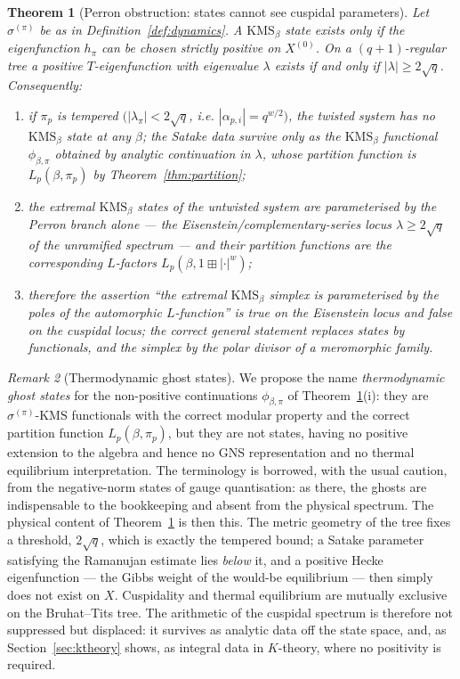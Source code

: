 \documentclass[11pt]{amsart}
\numberwithin{equation}{section}
\newtheorem{theorem}{Theorem}[section]
\theoremstyle{definition}
\theoremstyle{remark}
\newtheorem{remark}[theorem]{Remark}
\newcommand{\KMS}{\mathrm{KMS}}
\begin{document}
\begin{theorem}[Perron obstruction: states cannot see cuspidal parameters]\label{thm:perron}
Let $\sigma^{(\pi)}$ be as in Definition~\ref{def:dynamics}. A $\KMS_\beta$ state exists
only if the eigenfunction $h_\pi$ can be chosen strictly positive on $X^{(0)}$. On a
$(q+1)$-regular tree a positive $T$-eigenfunction with eigenvalue $\lambda$ exists if and
only if $|\lambda|\ge2\sqrt q$. Consequently:
\begin{enumerate}
\item[(i)] if $\pi_p$ is tempered $(|\lambda_\pi|<2\sqrt q$, i.e.
$|\alpha_{p,i}|=q^{w/2})$, the twisted system has \emph{no} $\KMS_\beta$ state at any
$\beta$; the Satake data survive only as the $\KMS_\beta$ \emph{functional}
$\phi_{\beta,\pi}$ obtained by analytic continuation in $\lambda$, whose partition
function is $L_p(\beta,\pi_p)$ by Theorem~\ref{thm:partition};
\item[(ii)] the extremal $\KMS_\beta$ states of the untwisted system are parameterised by
the Perron branch alone --- the Eisenstein/complementary-series locus
$\lambda\ge2\sqrt q$ of the unramified spectrum --- and their partition functions are the
corresponding $L$-factors $L_p(\beta,1\boxplus|\cdot|^{w})$;
\item[(iii)] therefore the assertion ``the extremal $\KMS_\beta$ simplex is
parameterised by the poles of the automorphic $L$-function'' is true on the Eisenstein
locus and false on the cuspidal locus; the correct general statement replaces states by
functionals, and the simplex by the polar divisor of a meromorphic family.
\end{enumerate}
\end{theorem}

\begin{remark}[Thermodynamic ghost states]\label{rem:ghost}
We propose the name \emph{thermodynamic ghost states} for the non-positive continuations
$\phi_{\beta,\pi}$ of Theorem~\ref{thm:perron}(i): they are $\sigma^{(\pi)}$-$\KMS$
functionals with the correct modular property and the correct partition function
$L_p(\beta,\pi_p)$, but they are not states, having no positive extension to the algebra
and hence no GNS representation and no thermal equilibrium interpretation. The
terminology is borrowed, with the usual caution, from the negative-norm states of gauge
quantisation: as there, the ghosts are indispensable to the bookkeeping and absent from
the physical spectrum. The physical content of Theorem~\ref{thm:perron} is then this. The
metric geometry of the tree fixes a threshold, $2\sqrt q$, which is exactly the tempered
bound; a Satake parameter satisfying the Ramanujan estimate lies \emph{below} it, and a
positive Hecke eigenfunction --- the Gibbs weight of the would-be equilibrium --- then
simply does not exist on $X$. Cuspidality and thermal equilibrium are mutually exclusive
on the Bruhat--Tits tree. The arithmetic of the cuspidal spectrum is therefore not
suppressed but displaced: it survives as analytic data off the state space, and, as
Section~\ref{sec:ktheory} shows, as integral data in $K$-theory, where no positivity is
required.
\end{remark}
\end{document}
